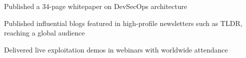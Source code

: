 \item Published a 34-page whitepaper on DevSecOps architecture
\item Published influential blogs featured in high-profile newsletters such as TLDR, reaching a global audience
\item Delivered live exploitation demos in webinars with worldwide attendance